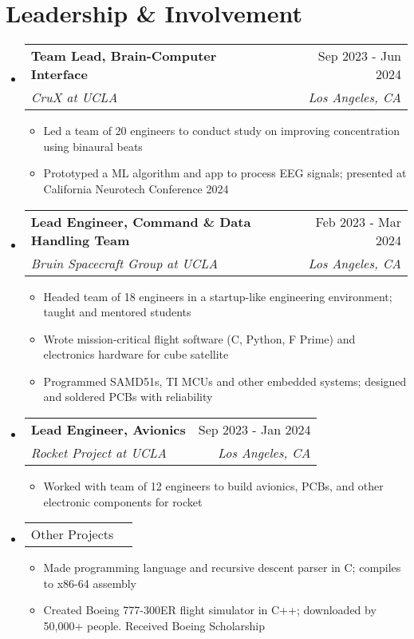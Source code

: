 \documentclass[letterpaper,11pt]{article}
\makeatletter
\newcommand{\resumeItem}[1]{
  \item\small{
    {#1 \vspace{-4pt}}
  }
}
\newcommand{\resumeSubheading}[4]{
  \vspace{-2pt}\item
    \begin{tabular*}{0.97\textwidth}[t]{l@{\extracolsep{\fill}}r}
      \textbf{#1} & #2 \\
      \textit{\small#3} & \textit{\small #4} \\
    \end{tabular*}\vspace{-8pt}
}
\newcommand{\resumeProjectHeading}[2]{
    \item
    \begin{tabular*}{0.97\textwidth}{l@{\extracolsep{\fill}}r}
      \small#1 & #2 \\
    \end{tabular*}\vspace{-7pt}
}
\newcommand{\resumeSubHeadingListStart}{\begin{itemize}[leftmargin=0.15in, label={}]}
\newcommand{\resumeSubHeadingListEnd}{\end{itemize}}
\newcommand{\resumeItemListStart}{\begin{itemize}}
\newcommand{\resumeItemListEnd}{\end{itemize}\vspace{-5pt}}
\makeatother
\begin{document}
\section{Leadership \& Involvement}
    \resumeSubHeadingListStart
        \resumeSubheading
        {Team Lead, Brain-Computer Interface}{Sep 2023 - Jun 2024}
        {CruX at UCLA}{Los Angeles, CA}
        \resumeItemListStart
            \resumeItem{Led a team of 20 engineers to conduct study on improving concentration using binaural beats}
            \resumeItem{Prototyped a ML algorithm and app to process EEG signals; presented at California Neurotech Conference 2024}
        \resumeItemListEnd

        \resumeSubheading
        {Lead Engineer, Command \& Data Handling Team}{Feb 2023 - Mar 2024}
        {Bruin Spacecraft Group at UCLA}{Los Angeles, CA}
        \resumeItemListStart
            \resumeItem{Headed team of 18 engineers in a startup-like engineering environment; taught and mentored students}
            \resumeItem{Wrote mission-critical flight software (C, Python, F Prime) and electronics hardware for cube satellite}
            \resumeItem{Programmed SAMD51s, TI MCUs and other embedded systems; designed and soldered PCBs with reliability}
        \resumeItemListEnd

        \resumeSubheading
        {Lead Engineer, Avionics}{Sep 2023 - Jan 2024}
        {Rocket Project at UCLA}{Los Angeles, CA}
        \resumeItemListStart
            \resumeItem{Worked with team of 12 engineers to build avionics, PCBs, and other electronic components for rocket}
        \resumeItemListEnd

        \resumeProjectHeading
        {Other Projects}{}
        \resumeItemListStart
            \resumeItem{Made programming language and recursive descent parser in C; compiles to x86-64 assembly}
            \resumeItem{Created Boeing 777-300ER flight simulator in C++; downloaded by 50,000+ people. Received Boeing Scholarship}
        \resumeItemListEnd
    \resumeSubHeadingListEnd



%
\end{document}
